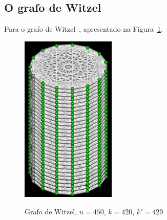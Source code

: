 \subsection{O grafo de Witzel}
Para o grafo de Witzel~\cite{cite:example-witzel},
apresentado na Figura~\ref{fig:example-witzel}.

\begin{figure}[htb]
\centering
\includegraphics[width=0.4\textwidth]{img/witzel.png}
\label{fig:example-witzel}
\caption{Grafo de Witzel, $n=450$, $k=420$, $k'=429$}
\end{figure}

